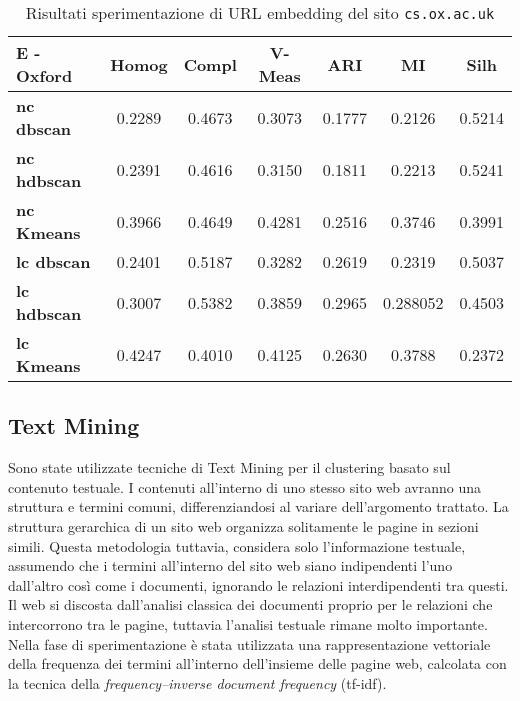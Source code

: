 \begin{table}[H]
	\begin{tabular}{| l | c | c | c | c | c | c |}
	\hline
	\textbf{E - Oxford}  & \textbf{Homog} & \textbf{Compl} & \textbf{V-Meas}  & \textbf{ARI}  & \textbf{MI}  & \textbf{Silh} \\ [3ex] \hline
	\textbf{nc dbscan} & 0.2289 & 0.4673 & 0.3073 & 0.1777 & 0.2126 & 0.5214 \\ [3ex]
	 \hline 
	\textbf{nc hdbscan} & 0.2391 & 0.4616 & 0.3150 & 0.1811 & 0.2213 & 0.5241 \\ [3ex]
	 \hline
	\textbf{nc Kmeans} & 0.3966 & 0.4649 & 0.4281 & 0.2516 & 0.3746 & 0.3991 \\ [3ex]
	 \hline	
	\textbf{lc dbscan} & 0.2401 & 0.5187 & 0.3282 & 0.2619 & 0.2319 & 0.5037 \\ [3ex]
	\hline
	\textbf{lc hdbscan} & 0.3007 & 0.5382 & 0.3859 & 0.2965 & 0.288052 & 0.4503 \\ [3ex]
	\hline
	\textbf{lc Kmeans} & 0.4247 & 0.4010 & 0.4125 & 0.2630 & 0.3788 & 0.2372 \\ [3ex]
	\hline
	\end{tabular}
	\caption{Risultati sperimentazione di URL embedding del sito \texttt{cs.ox.ac.uk}}
	\label{metricheEmbedOx}
\end{table}

\subsection{Text Mining}
Sono state utilizzate tecniche di Text Mining per il clustering basato sul contenuto testuale. I contenuti all'interno di uno stesso sito web avranno una struttura e termini comuni, differenziandosi al variare dell'argomento trattato. La struttura gerarchica di un sito web organizza solitamente le pagine in sezioni simili. Questa metodologia tuttavia, considera solo l'informazione testuale, assumendo che i termini all'interno del sito web siano indipendenti l'uno dall'altro così come i documenti, ignorando le relazioni interdipendenti tra questi. Il web si discosta dall'analisi classica dei documenti proprio per le relazioni che intercorrono tra le pagine, tuttavia l'analisi testuale rimane molto importante.
\\
Nella fase di sperimentazione è stata utilizzata una rappresentazione vettoriale della frequenza dei termini all'interno dell'insieme delle pagine web, calcolata con la tecnica della \textit{frequency–inverse document frequency} (tf-idf).

